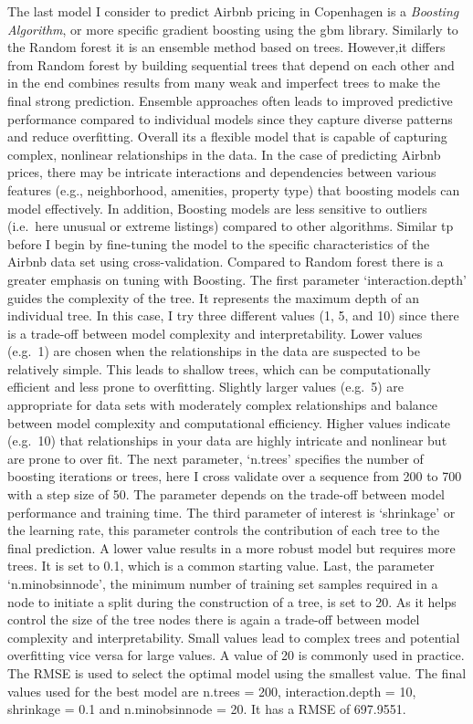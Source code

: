 \documentclass[
]{article}
\begin{document}
The last model I consider to predict Airbnb pricing in Copenhagen is a
\emph{Boosting Algorithm}, or more specific gradient boosting using the
gbm library. Similarly to the Random forest it is an ensemble method
based on trees. However,it differs from Random forest by building
sequential trees that depend on each other and in the end combines
results from many weak and imperfect trees to make the final strong
prediction. Ensemble approaches often leads to improved predictive
performance compared to individual models since they capture diverse
patterns and reduce overfitting. Overall its a flexible model that is
capable of capturing complex, nonlinear relationships in the data. In
the case of predicting Airbnb prices, there may be intricate
interactions and dependencies between various features (e.g.,
neighborhood, amenities, property type) that boosting models can model
effectively. In addition, Boosting models are less sensitive to outliers
(i.e.~here unusual or extreme listings) compared to other algorithms.
Similar tp before I begin by fine-tuning the model to the specific
characteristics of the Airbnb data set using cross-validation. Compared
to Random forest there is a greater emphasis on tuning with Boosting.
The first parameter `interaction.depth' guides the complexity of the
tree. It represents the maximum depth of an individual tree. In this
case, I try three different values (1, 5, and 10) since there is a
trade-off between model complexity and interpretability. Lower values
(e.g.~1) are chosen when the relationships in the data are suspected to
be relatively simple. This leads to shallow trees, which can be
computationally efficient and less prone to overfitting. Slightly larger
values (e.g.~5) are appropriate for data sets with moderately complex
relationships and balance between model complexity and computational
efficiency. Higher values indicate (e.g.~10) that relationships in your
data are highly intricate and nonlinear but are prone to over fit. The
next parameter, `n.trees' specifies the number of boosting iterations or
trees, here I cross validate over a sequence from 200 to 700 with a step
size of 50. The parameter depends on the trade-off between model
performance and training time. The third parameter of interest is
`shrinkage' or the learning rate, this parameter controls the
contribution of each tree to the final prediction. A lower value results
in a more robust model but requires more trees. It is set to 0.1, which
is a common starting value. Last, the parameter `n.minobsinnode', the
minimum number of training set samples required in a node to initiate a
split during the construction of a tree, is set to 20. As it helps
control the size of the tree nodes there is again a trade-off between
model complexity and interpretability. Small values lead to complex
trees and potential overfitting vice versa for large values. A value of
20 is commonly used in practice. The RMSE is used to select the optimal
model using the smallest value. The final values used for the best model
are n.trees = 200, interaction.depth = 10, shrinkage = 0.1 and
n.minobsinnode = 20. It has a RMSE of 697.9551.
\end{document}
